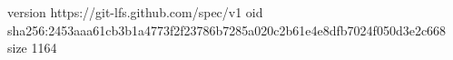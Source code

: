 version https://git-lfs.github.com/spec/v1
oid sha256:2453aaa61cb3b1a4773f2f23786b7285a020c2b61e4e8dfb7024f050d3e2c668
size 1164
